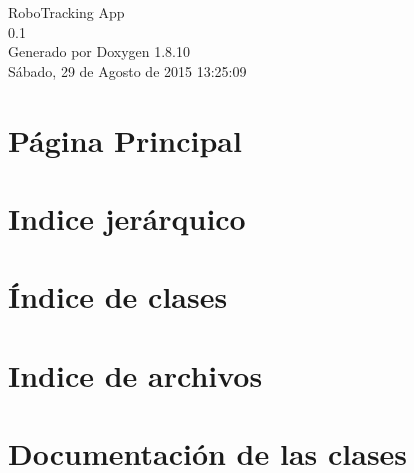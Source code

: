 \documentclass[twoside]{book}
\newcommand{\+}{\discretionary{\mbox{\scriptsize$\hookleftarrow$}}{}{}}
\newcommand{\clearemptydoublepage}{%
  \newpage{\pagestyle{empty}\cleardoublepage}%
}
\begin{document}
\hypersetup{pageanchor=false,
             bookmarks=true,
             bookmarksnumbered=true,
             pdfencoding=unicode
            }
\begin{titlepage}
\vspace*{7cm}
\begin{center}%
{\Large Robo\+Tracking App \\[1ex]\large 0.\+1 }\\
\vspace*{1cm}
{\large Generado por Doxygen 1.8.10}\\
\vspace*{0.5cm}
{\small Sábado, 29 de Agosto de 2015 13:25:09}\\
\end{center}
\end{titlepage}
\clearemptydoublepage
\tableofcontents
\clearemptydoublepage
{}
\hypersetup{pageanchor=true}

\chapter{P\'{a}gina Principal}
\label{index}\hypertarget{index}{}
\chapter{Indice jerárquico}

\chapter{Índice de clases}

\chapter{Indice de archivos}

\chapter{Documentación de las clases}






















\end{document}
